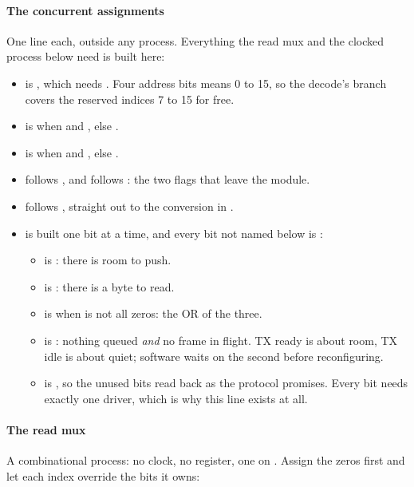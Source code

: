 \paragraph{The concurrent assignments} One line each, outside any process. Everything the read mux
and the clocked process below need is built here:
\begin{itemize}
  \item {} is , which needs
    . Four address bits means 0 to 15, so the decode's  branch
    covers the reserved indices 7 to 15 for free.
  \item {} is  when  and ,
    else .
  \item {} is  when  and ,
    else .
  \item {} follows , and  follows : the
    two flags that leave the module.
  \item {} follows , straight out to the conversion in
    .
  \item {} is built one bit at a time, and every bit not named below is :
  \begin{itemize}
    \item {} is : there is room to push.
    \item {} is : there is a byte to read.
    \item {} is  when  is not all zeros: the OR
      of the three.
    \item {} is : nothing queued
      \emph{and} no frame in flight. TX ready is about room, TX idle is about quiet; software waits
      on the second before reconfiguring.
    \item {} is , so the unused bits read back as
      the protocol promises. Every bit needs exactly one driver, which is why this line exists at
      all.
  \end{itemize}
\end{itemize}

\paragraph{The read mux} A combinational process: no clock, no register, one  on
. Assign the zeros first and let each index override the bits it owns:

